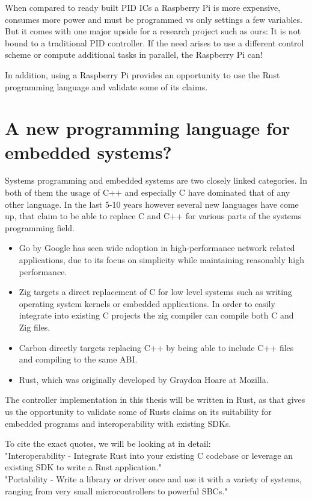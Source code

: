 When compared to ready built PID ICs a Raspberry Pi is more expensive, consumes more power and must be programmed vs only settings a few variables.
But it comes with one major upside for a research project such as ours:
It is not bound to a traditional PID controller. If the need arises to use a different control scheme or compute additional tasks in parallel, the Raspberry Pi can!

In addition, using a Raspberry Pi provides an opportunity to use the Rust programming language and validate some of its claims.

\section{A new programming language for embedded systems?}
\label{sec:introduction:rust}

Systems programming and embedded systems are two closely linked categories.
In both of them the usage of C++ and especially C have dominated that of any other language.
In the last 5-10 years however several new languages have come up,
that claim to be able to replace C and C++ for various parts of the systems programming field.
\begin{itemize}
    \item Go by Google has seen wide adoption in high-performance network related applications, due to its focus on simplicity while maintaining reasonably high performance.\cite{Go}
    \item Zig targets a direct replacement of C for low level systems such as writing operating system kernels or embedded applications. In order to easily integrate into existing C projects the zig compiler can compile both C and Zig files.\cite{Zig}
    \item Carbon directly targets replacing C++ by being able to include C++ files and compiling to the same ABI.\cite{Carbon}
    \item Rust, which was originally developed by Graydon Hoare at Mozilla.\cite{TheRustProgrammingLanguage}
\end{itemize}

The controller implementation in this thesis will be written in Rust,
as that gives us the opportunity to validate some of Rusts claims on its suitability for embedded programs and interoperability with existing SDKs.

To cite the exact quotes, we will be looking at in detail:\\
"Interoperability - Integrate Rust into your existing C codebase or leverage an existing SDK to write a Rust application."\\
"Portability - Write a library or driver once and use it with a variety of systems, ranging from very small microcontrollers to powerful SBCs."\\
\cite{RustEmbeddedSite}

